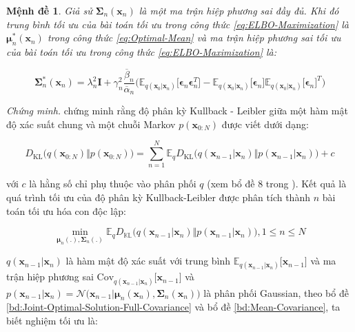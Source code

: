 \documentclass[14pt, a4paper]{article}
\numberwithin{equation}{section}
\numberwithin{figure}{section}
\newtheorem{md}{Mệnh đề}
\numberwithin{dl}{section}
\numberwithin{md}{section}
\numberwithin{bd}{section}
\numberwithin{dn}{section}
\numberwithin{hq}{section}
\begin{document}
    \begin{md} \label{md:Optimal-Covariance-Solely-Full-Covariance}
        Giả sử $\boldsymbol{\Sigma}_n (\boldsymbol{x}_n)$ là một ma trận hiệp phương sai đầy đủ. 
        Khi đó trung bình tối ưu của bài toán tối ưu trong công thức \ref{eq:ELBO-Maximization} là $\boldsymbol{\mu}_n^{\ast} (\boldsymbol{x}_n)$ trong công thức \ref{eq:Optimal-Mean} và ma trận hiệp phương sai tối ưu của bài toán tối ưu trong công thức \ref{eq:ELBO-Maximization} là:

        \begin{equation}
            \boldsymbol{\Sigma}_n^{\ast} (\boldsymbol{x}_n) = \lambda_n^2 \boldsymbol{I} + \gamma_n^2 \dfrac{\overline{\beta}_n}{\overline{\alpha}_n} \big( \mathbb{E}_{q(\boldsymbol{x}_0 \vert \boldsymbol{x}_n)} \lbrack \boldsymbol{\epsilon}_n \boldsymbol{\epsilon}_n^T \rbrack - \mathbb{E}_{q(\boldsymbol{x}_0 \vert \boldsymbol{x}_n)} \lbrack \boldsymbol{\epsilon}_n \rbrack \mathbb{E}_{q(\boldsymbol{x}_0 \vert \boldsymbol{x}_n)} \lbrack \boldsymbol{\epsilon}_n \rbrack^T \big)
        \end{equation}
    \end{md}

    \textit{Chứng minh.}
    \cite{bao2021analytic} chứng minh rằng độ phân kỳ Kullback - Leibler giữa một hàm mật độ xác suất chung và một chuỗi Markov $p(\boldsymbol{x}_{0:N})$ được viết dưới dạng:

    \begin{equation}
        D_{\mathrm{KL}} \big ( q(\boldsymbol{x}_{0:N}) \Vert p(\boldsymbol{x}_{0:N}) \big ) = \sum_{n=1}^N \mathbb{E}_{q} D_{\mathrm{KL}} \big( q(\boldsymbol{x}_{n-1} \vert \boldsymbol{x}_n) \Vert p(\boldsymbol{x}_{n-1} \vert \boldsymbol{x}_n) \big) + c
    \end{equation}

    với $c$ là hằng số chỉ phụ thuộc vào phân phối $q$ (xem bổ đề 8 trong \cite{bao2021analytic}).
    Kết quả là quá trình tối ưu của độ phân kỳ Kullback-Leibler được phân tích thành $n$ bài toán tối ưu hóa con độc lập:

    \begin{equation}
        \min_{\boldsymbol{\mu}_n (.), \boldsymbol{\Sigma}_n (.)} \mathbb{E}_q D_{\mathbb{KL}} \big( q(\boldsymbol{x}_{n-1} \vert \boldsymbol{x}_n) \Vert p(\boldsymbol{x}_{n-1} \vert \boldsymbol{x}_n) \big), 1 \leq n \leq N
    \end{equation}

    $q(\boldsymbol{x}_{n-1} \vert \boldsymbol{x}_n)$ là hàm mật độ xác suất với trung bình $\mathbb{E}_{q(\boldsymbol{x}_{n-1} \vert \boldsymbol{x}_n)} \lbrack \boldsymbol{x}_{n-1} \rbrack$ và ma trận hiệp phương sai $\mathrm{Cov}_{q(\boldsymbol{x}_{n-1} \vert \boldsymbol{x}_n)} \lbrack \boldsymbol{x}_{n-1} \rbrack$ và $p(\boldsymbol{x}_{n-1} \vert \boldsymbol{x}_n) = \mathcal{N} \big( \boldsymbol{x}_{n-1} \vert \boldsymbol{\mu}_n (\boldsymbol{x}_n), \boldsymbol{\Sigma}_n (\boldsymbol{x}_n) \big)$ là phân phối Gaussian,
    theo bổ đề \ref{bd:Joint-Optimal-Solution-Full-Covariance} và bổ đề \ref{bd:Mean-Covariance}, ta biết nghiệm tối ưu là:
\end{document}
